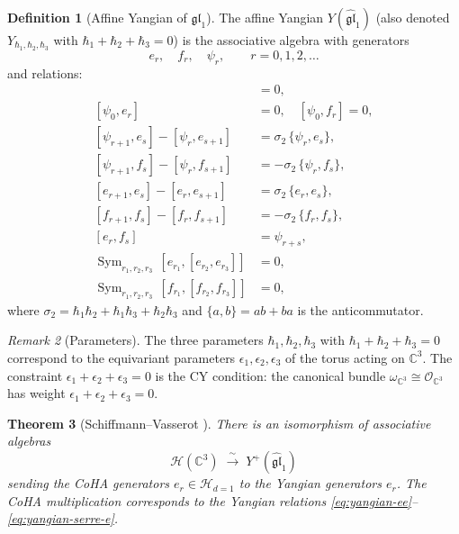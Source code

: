 \documentclass[11pt]{article}
\newtheorem{theorem}{Theorem}[section]
\theoremstyle{definition}
\newtheorem{definition}[theorem]{Definition}
\theoremstyle{remark}
\newtheorem{remark}[theorem]{Remark}
\newcommand{\CC}{\mathbb{C}}
\newcommand{\CoHA}{\mathcal{H}}
\newcommand{\cO}{\mathcal{O}}
\newcommand{\gl}{\mathfrak{gl}}
\begin{document}
\begin{definition}[Affine Yangian of $\gl_1$]
\label{def:affine-yangian-gl1}
The affine Yangian $Y(\widehat{\gl}_1)$ (also denoted $Y_{\hbar_1, \hbar_2, \hbar_3}$
with $\hbar_1 + \hbar_2 + \hbar_3 = 0$) is the associative algebra with
generators
\[
 e_r, \quad f_r, \quad \psi_r, \qquad r = 0, 1, 2, \ldots
\]
and relations:
\begin{align}
 [\psi_r, \psi_s] &= 0, \label{eq:yangian-cartan} \\
 [\psi_0, e_r] &= 0, \quad [\psi_0, f_r] = 0, \label{eq:yangian-psi0} \\
 [\psi_{r+1}, e_s] - [\psi_r, e_{s+1}] &= \sigma_2\, \{\psi_r, e_s\}, \label{eq:yangian-psi-e} \\
 [\psi_{r+1}, f_s] - [\psi_r, f_{s+1}] &= -\sigma_2\, \{\psi_r, f_s\}, \label{eq:yangian-psi-f} \\
 [e_{r+1}, e_s] - [e_r, e_{s+1}] &= \sigma_2\, \{e_r, e_s\}, \label{eq:yangian-ee} \\
 [f_{r+1}, f_s] - [f_r, f_{s+1}] &= -\sigma_2\, \{f_r, f_s\}, \label{eq:yangian-ff} \\
 [e_r, f_s] &= \psi_{r+s}, \label{eq:yangian-ef} \\
 \operatorname{Sym}_{r_1, r_2, r_3}\, [e_{r_1}, [e_{r_2}, e_{r_3}]] &= 0, \label{eq:yangian-serre-e} \\
 \operatorname{Sym}_{r_1, r_2, r_3}\, [f_{r_1}, [f_{r_2}, f_{r_3}]] &= 0, \label{eq:yangian-serre-f}
\end{align}
where $\sigma_2 = \hbar_1 \hbar_2 + \hbar_1 \hbar_3 + \hbar_2 \hbar_3$ and
$\{a,b\} = ab + ba$ is the anticommutator.
\end{definition}

\begin{remark}[Parameters]
\label{rem:parameters}
The three parameters $\hbar_1, \hbar_2, \hbar_3$ with
$\hbar_1 + \hbar_2 + \hbar_3 = 0$ correspond to the equivariant parameters
$\epsilon_1, \epsilon_2, \epsilon_3$ of the torus acting on $\CC^3$. The
constraint $\epsilon_1 + \epsilon_2 + \epsilon_3 = 0$ is the CY condition:
the canonical bundle $\omega_{\CC^3} \cong \cO_{\CC^3}$ has weight
$\epsilon_1 + \epsilon_2 + \epsilon_3 = 0$.
\end{remark}

\begin{theorem}[Schiffmann--Vasserot \cite{SV-elliptic-hall, SV-cherednik-aha}]
\label{thm:sv}
There is an isomorphism of associative algebras
\[
 \CoHA(\CC^3) \;\xrightarrow{\;\sim\;}\; Y^+(\widehat{\gl}_1)
\]
sending the CoHA generators $e_r \in \CoHA_{d=1}$ to the Yangian
generators $e_r$. The CoHA multiplication corresponds to the Yangian
relations \eqref{eq:yangian-ee}--\eqref{eq:yangian-serre-e}.
\end{theorem}
\end{document}
